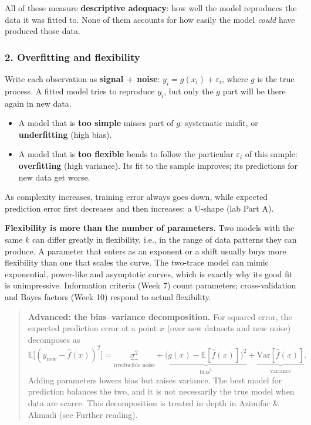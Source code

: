 All of these measure \textbf{descriptive adequacy}: how well the model
reproduces the data it was fitted to. None of them accounts for how
easily the model \emph{could} have produced those data.

\subsubsection{2. Overfitting and flexibility}

Write each observation as \textbf{signal + noise}:
\(y_i = g(x_i) + \varepsilon_i\), where \(g\) is the true process. A
fitted model tries to reproduce \(y_i\), but only the \(g\) part will be
there again in new data.

\begin{itemize}
\tightlist
\item
  A model that is \textbf{too simple} misses part of \(g\): systematic
  misfit, or \textbf{underfitting} (high bias).
\item
  A model that is \textbf{too flexible} bends to follow the particular
  \(\varepsilon_i\) of this sample: \textbf{overfitting} (high
  variance). Its fit to the sample improves; its predictions for new
  data get worse.
\end{itemize}

As complexity increases, training error always goes down, while expected
prediction error first decreases and then increases: a U-shape (lab Part
A).

\textbf{Flexibility is more than the number of parameters.} Two models
with the same \(k\) can differ greatly in flexibility, i.e., in the
range of data patterns they can produce. A parameter that enters as an
exponent or a shift usually buys more flexibility than one that scales
the curve. The two-trace model can mimic exponential, power-like and
asymptotic curves, which is exactly why its good fit is unimpressive.
Information criteria (Week 7) count parameters; cross-validation and
Bayes factors (Week 10) respond to actual flexibility.

\begin{quote}
\textbf{Advanced: the bias--variance decomposition.} For squared error,
the expected prediction error at a point \(x\) (over new datasets and
new noise) decomposes as
\[\mathbb{E}\big[(y_{\text{new}} - \hat f(x))^2\big] = \underbrace{\sigma^2}_{\text{irreducible noise}} + \underbrace{\big(g(x) - \mathbb{E}[\hat f(x)]\big)^2}_{\text{bias}^2} + \underbrace{\mathrm{Var}[\hat f(x)]}_{\text{variance}}.\]
Adding parameters lowers bias but raises variance. The best model for
prediction balances the two, and it is not necessarily the true model
when data are scarce. This decomposition is treated in depth in Azimifar
\& Ahmadi (see Further reading).
\end{quote}


